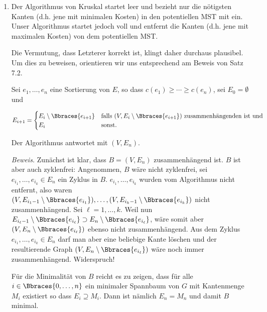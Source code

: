 \begin{solution}

\phantom{}

\begin{enumerate}[label = (\Alph*)]

    \item Der Algorithmus von Kruskal startet leer und bezieht nur die nötigsten Kanten (d.h. jene mit minimalen Kosten) in den potentiellen MST mit ein.
    Unser Algorithmus startet jedoch voll und entfernt die  Kanten (d.h. jene mit maximalen Kosten) von dem potentiellen MST.

    Die Vermutung, dass Letzterer korrekt ist, klingt daher durchaus plausibel.
    Um dies zu beweisen, orientieren wir uns entsprechend am Beweis von Satz 7.2.

    Sei $e_1, \dots, e_n$ eine Sortierung von $E$, so dass $c(e_1) \geq \cdots \geq c(e_n)$, sei $E_0 = \emptyset$ und

    \begin{align*}
        E_{i+1}
        =
        \begin{cases}
            E_i \setminus \Bbraces{e_{i+1}} & \text{falls}~ (V, E_i \setminus \Bbraces{e_{i+1}}) ~\text{zusammenhängenden ist und} \\
            E_i                             & \text{sonst.}
        \end{cases}
    \end{align*}

    Der Algorithmus antwortet mit $(V, E_n)$.

    \textit{Beweis.}
    Zunächst ist klar, dass $B = (V, E_n)$ zusammenhängend ist.
    $B$ ist aber auch zyklenfrei:
    Angenommen, $B$ wäre nicht zyklenfrei, sei $e_{i_1}, \dots, e_{i_k} \in E_n$ ein Zyklus in $B$.
    $e_{i_1}, \dots, e_{i_k}$ wurden vom Algorithmus nicht entfernt, also waren $(V, E_{i_1 - 1} \setminus \Bbraces{e_{i_1}}), \dots, (V, E_{i_k - 1} \setminus \Bbraces{e_{i_k}})$ nicht zusammenhängend.
    Sei $\ell = 1, \dots, k$.
    Weil nun $E_{i_\ell - 1} \setminus \Bbraces{e_{i_\ell}} \supset E_n \setminus \Bbraces{e_{i_\ell}}$, wäre somit aber $(V, E_n \setminus \Bbraces{e_{i_\ell}})$ ebenso nicht zusammenhängend.
    Aus dem Zyklus $e_{i_1}, \dots, e_{i_k} \in E_n$ darf man aber eine beliebige Kante löschen und der resultierende Graph $(V, E_n \setminus \Bbraces{e_{i_\ell}})$ wäre noch immer zusammenhängend.
    Widerspruch!

    Für die Minimalität von $B$ reicht es zu zeigen, dass für alle $i \in \Bbraces{0, \dots, n}$ ein minimaler Spannbaum von $G$ mit Kantenmenge $M_i$ existiert so dass $E_i \supseteq M_i$.
    Dann ist nämlich $E_n = M_n$ und damit $B$ minimal.


\end{enumerate}
\end{solution}

